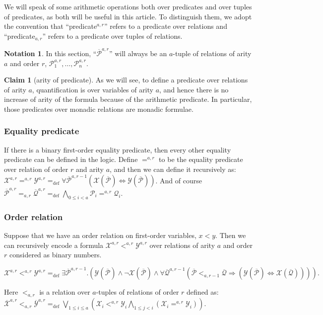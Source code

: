 \documentclass[a4paper,12pt]{article}
\newcommand{\sss}[1]{\subsubsection{#1}}
\theoremstyle{definition}
\newtheorem{claim}[theorem]{Claim}
\newtheorem{notation}[theorem]{Notation}
\newcommand{\mc}{\mathcal}
\newcommand{\ol}{\overline}
\newcommand{\olmc}[1]{\overline{\mathcal{#1}}}
\newcommand{\ed}{=_{\mathrm{def}}}
\begin{document}
We will speak of some arithmetic operations both over predicates and
over tuples of predicates, as both will be useful in this article. To
distinguish them, we adopt the convention that ``predicate$^{a,r}$''
refers to a predicate over relations and ``predicate$_{a,r}$'' refers
to a predicate over tuples of relations.

\begin{notation}
  In this section, ``$\olmc P^{a,r}$'' will always be an $a$-tuple of
  relations of arity $a$ and order $r$, $\mc P_{1}^{a,r},\dots,\mc
  P^{a,r}_{n}$.
\end{notation}

\begin{claim}[arity of predicate]\label{mon-pred}
  As we will see, to define a predicate over relations of arity $a$,
  quantification is over variables of arity $a$, and hence there is no
  increase of arity of the formula because of the arithmetic
  predicate. In particular, those predicates over monadic relations
  are monadic formulae.
\end{claim}

\sss{Equality predicate}
If there is a binary first-order equality predicate, then every other
equality predicate can be defined in the logic. Define $=^{a,r}$ to be
the equality predicate over relation of order $r$ and arity $a$, and
then we can define it recursively as: $\mathcal{X}^{a,r}=^{a,r}\mathcal{Y}^{a,r}=_{\mathrm
  {def}}\forall\mathcal{\ol P}^{a,r-1}(\mathcal{X}(\mathcal
{\ol P})\Leftrightarrow\mathcal{Y}(\mathcal{\ol P}))
$. And of course $\olmc P^{a,r}=_{{a,r}}\olmc Q^{a,r}\ed
\bigwedge_{0\le i<a}\mc P_{i}=^{a,r}\mc Q_{i}$.

\sss{Order relation}\label{order}
Suppose that we have an order relation on first-order variables,
$x<y$. Then we can recursively encode a formula
$\mathcal{X}^{a,r}<^{a,r}\mathcal{Y}^{a,r}$ over relations of arity
$a$ and order $r$ considered as binary numbers.

$\mathcal{X}^{a,r}<^{a,r}\mathcal{Y}^{a,r}=_{\mathrm {def}}\exists
\olmc P^{a,r-1}.(\mathcal{Y}(\mathcal {\ol P})\land
\neg\mathcal{X}(\mathcal {\ol P})\land\forall\mathcal{\ol
  Q}^{a,r-1}(\mathcal{\ol P}<_{a,r-1}\mathcal {\ol
  Q}\Rightarrow (\mathcal{Y}(\mathcal {\ol
  P})\Leftrightarrow\mathcal{X}(\mathcal{\ol Q})))).
$

Here $<_{a,r}$ is a relation over $a$-tuples of relations of order $r$
defined as: $\mathcal{\ol X}^{a,r}<_{a,r}\mathcal{\ol
  Y}^{a,r}\ed\bigvee_{1\le i\le a}(\mathcal X_i<^{a,r}\mathcal
Y_i\bigwedge_{1\le j<i}(\mathcal X_i=^{a,r}\mathcal Y_i)).
$
\end{document}

